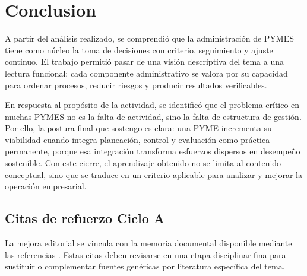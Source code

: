 \documentclass[
	spanish,
	letterpaper, oneside
]{article}
\begin{document}

\section{Conclusion}

A partir del análisis realizado, se comprendió que la administración de PYMES tiene como núcleo la toma de decisiones con criterio, seguimiento y ajuste continuo. El trabajo permitió pasar de una visión descriptiva del tema a una lectura funcional: cada componente administrativo se valora por su capacidad para ordenar procesos, reducir riesgos y producir resultados verificables.

En respuesta al propósito de la actividad, se identificó que el problema crítico en muchas PYMES no es la falta de actividad, sino la falta de estructura de gestión. Por ello, la postura final que sostengo es clara: una PYME incrementa su viabilidad cuando integra planeación, control y evaluación como práctica permanente, porque esa integración transforma esfuerzos dispersos en desempeño sostenible. Con este cierre, el aprendizaje obtenido no se limita al contenido conceptual, sino que se traduce en un criterio aplicable para analizar y mejorar la operación empresarial.




\subsection*{Citas de refuerzo Ciclo A}
La mejora editorial se vincula con la memoria documental disponible mediante las referencias \citep{unadm100TecnicasDidacticas2023,cicloARefuerzo02,cicloARefuerzo03,cicloARefuerzo04,cicloARefuerzo05}. Estas citas deben revisarse en una etapa disciplinar fina para sustituir o complementar fuentes genéricas por literatura específica del tema.
\end{document}

